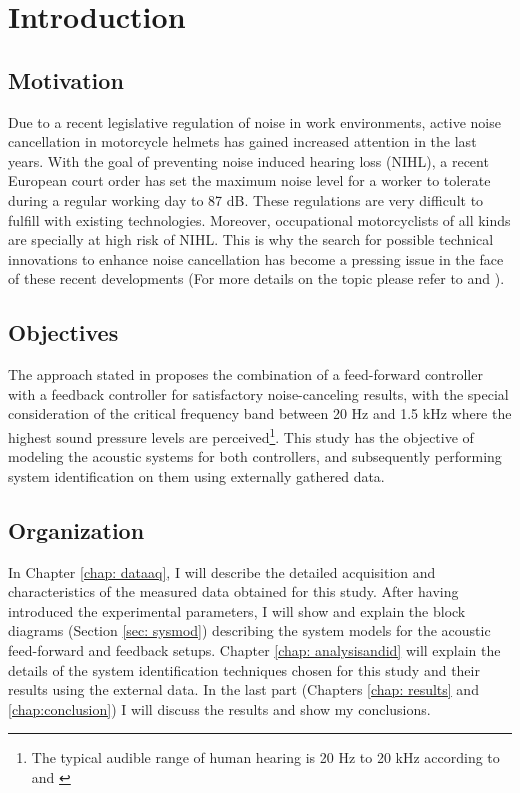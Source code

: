 


\chapter{Introduction}

\section{Motivation}
Due to a recent legislative regulation of noise in work environments, active noise cancellation in motorcycle helmets has gained increased attention in the last years. With the goal of preventing noise induced hearing loss (NIHL), a recent European court order has set the maximum noise level for a worker to tolerate during a regular working day to 87 dB. These regulations are very difficult to fulfill with existing technologies. Moreover, occupational motorcyclists of all kinds are specially at high risk of NIHL. This is why the search for possible technical innovations to enhance noise cancellation has become a pressing issue in the face of these recent developments (For more details on the topic please refer to \cite{castae2010active} and \cite{violini2014}). 

\section{Objectives}

The approach stated in \cite{castae2010active} proposes the combination of a feed-forward controller with a feedback controller for satisfactory noise-canceling results, with the special consideration of the critical frequency band between 20 Hz and 1.5 kHz where the highest sound pressure levels are perceived\footnote[1]{The typical audible range of human hearing is 20 Hz to 20 kHz according to \cite{castae2010active} and \cite{esnaola2005mirela}}. This study has the objective of modeling the acoustic systems for both controllers, and subsequently performing system identification on them using externally gathered data.

\section{Organization}

In Chapter \ref{chap: dataaq}, I will describe the detailed acquisition and characteristics of the measured data obtained for this study. After having introduced the experimental parameters, I will show and explain the block diagrams (Section \ref{sec: sysmod}) describing the system models for the acoustic feed-forward and feedback setups. Chapter \ref{chap: analysisandid} will explain the details of the system identification techniques chosen for this study and their results using the external data. In the last part (Chapters \ref{chap: results} and \ref{chap:conclusion}) I will discuss the results and show my conclusions.


